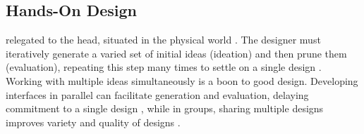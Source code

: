 %
%

\subsection{Hands-On Design}
 relegated to the head,  situated in the physical world \cite{Hutchins1995}.
The designer must iteratively generate a varied set of initial ideas  (ideation) and then prune them (evaluation), repeating this step many times to settle on a single design \cite{Buxton2007}.
Working with multiple ideas simultaneously is a boon to good design.
Developing interfaces in parallel can facilitate generation and evaluation, delaying commitment to a single design \cite{Hartmann2008, Resnick2008}, while
in groups, sharing multiple designs improves variety and quality of designs \cite{Dow2011}.


